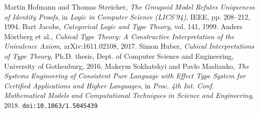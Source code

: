 \documentclass{article}
\theoremstyle{definition}
\begin{document}
\begin{thebibliography}{99}
 Martin Hofmann and Thomas Streicher, \textit{The Groupoid Model Refutes Uniqueness of Identity Proofs}, in \textit{Logic in Computer Science (LICS'94)}, IEEE, pp. 208–212, 1994.
 Bart Jacobs, \textit{Categorical Logic and Type Theory}, vol. 141, 1999.
 Anders Mörtberg et al., \textit{Cubical Type Theory: A Constructive Interpretation of the Univalence Axiom}, arXiv:1611.02108, 2017.
 Simon Huber, \textit{Cubical Interpretations of Type Theory}, Ph.D. thesis, Dept. of Computer Science and Engineering, University of Gothenburg, 2016.
 Maksym Sokhatskyi and Pavlo Maslianko, \textit{The Systems Engineering of Consistent Pure Language with Effect Type System for Certified Applications and Higher Languages}, in \textit{Proc. 4th Int. Conf. Mathematical Models and Computational Techniques in Science and Engineering}, 2018. \texttt{doi:10.1063/1.5045439}

\end{thebibliography}
\end{document}
